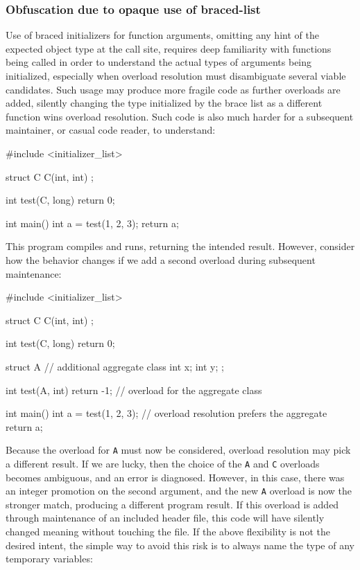 \subsubsection[Obfuscation due to opaque use of braced-list]{Obfuscation due to opaque use of braced-list}\label{obfuscation-due-to-opaque-use-of-braced-list}

Use of braced initializers for function arguments, omitting any hint of
the expected object type at the call site, requires deep familiarity
with functions being called in order to understand the actual types of
arguments being initialized, especially when overload resolution must
disambiguate several viable candidates. Such usage may produce more
fragile code as further overloads are added, silently changing the type
initialized by the brace list as a different function wins overload
resolution. Such code is also much harder for a subsequent maintainer,
or casual code reader, to understand:

\begin{emcppslisting}
#include <initializer_list>

struct C
{
    C(int, int) { }
};

int test(C, long) { return 0; }

int main()
{
    int a = test({1, 2}, 3);
    return a;
}
\end{emcppslisting}


\noindent This program compiles and runs, returning the intended result. However,
consider how the behavior changes if we add a second overload during
subsequent maintenance:

\begin{emcppslisting}
#include <initializer_list>

struct C
{
    C(int, int) { }
};

int test(C, long) { return 0; }

struct A  // additional aggregate class
{
    int x;
    int y;
};

int test(A, int) { return -1; }  // overload for the aggregate class

int main()
{
    int a = test({1, 2}, 3);     // overload resolution prefers the aggregate
    return a;
}
\end{emcppslisting}


\noindent Because the overload for \lstinline!A! must now be considered, overload
resolution may pick a different result. If we are lucky, then the choice
of the \lstinline!A! and \lstinline!C! overloads becomes ambiguous, and an
error is diagnosed. However, in this case, there was an integer
promotion on the second argument, and the new \lstinline!A! overload is now
the stronger match, producing a different program result. If this
overload is added through maintenance of an included header file, this
code will have silently changed meaning without touching the file. If
the above flexibility is not the desired intent, the simple way to avoid
this risk is to always name the type of any temporary variables:

